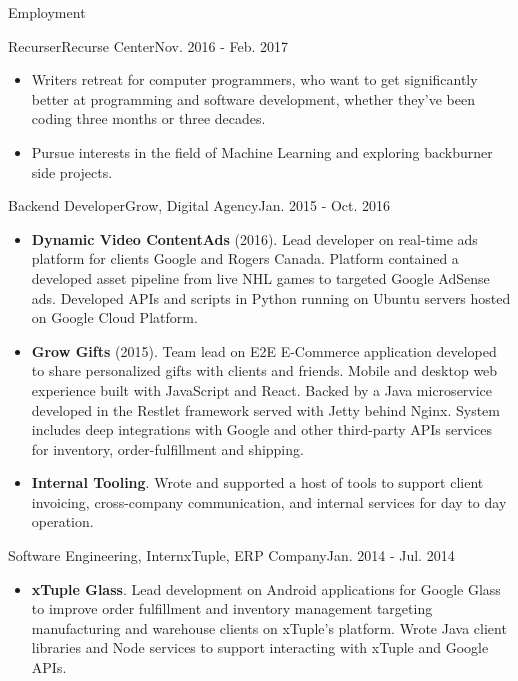 \documentclass[]{mcdowellcv}
\begin{document}
	\makeheader

	\begin{cvsection}{Employment}

		\begin{cvsubsection}{Recurser}{Recurse Center}{Nov. 2016 - Feb. 2017}
			\begin{itemize}
				\item Writers retreat for computer programmers, who want to get significantly better at programming and software development, whether they've been coding three months or three decades.
				\item Pursue interests in the field of Machine Learning and exploring backburner side projects.
			\end{itemize}
		\end{cvsubsection}

		\begin{cvsubsection}{Backend Developer}{Grow, Digital Agency}{Jan. 2015 - Oct. 2016}
			\begin{itemize}
				\item \textbf{Dynamic Video ContentAds} (2016). Lead developer on real-time ads platform for clients Google and Rogers Canada. Platform contained a developed asset pipeline from live NHL games to targeted Google AdSense ads. Developed APIs and scripts in Python running on Ubuntu servers hosted on Google Cloud Platform.
			\end{itemize}
			\begin{itemize}
				\item \textbf{Grow Gifts} (2015). Team lead on E2E E-Commerce application developed to share personalized gifts with clients and friends. Mobile and desktop web experience built with JavaScript and React. Backed by a Java microservice developed in the Restlet framework served with Jetty behind Nginx. System includes deep integrations with Google and other third-party APIs services for inventory, order-fulfillment and shipping.
			\end{itemize}
			\begin{itemize}
				\item \textbf{Internal Tooling}. Wrote and supported a host of tools to support client invoicing, cross-company communication, and internal services for day to day operation.
			\end{itemize}
		\end{cvsubsection}

		\begin{cvsubsection}{Software Engineering, Intern}{xTuple, ERP Company}{Jan. 2014 - Jul. 2014}
			\begin{itemize}
				\item \textbf{xTuple Glass}. Lead development on Android applications for Google Glass to improve order fulfillment and inventory management targeting manufacturing and warehouse clients on xTuple’s platform. Wrote Java client libraries and Node services to support interacting with xTuple and Google APIs.
			\end{itemize}
		\end{cvsubsection}


\end{cvsection}
\end{document}
